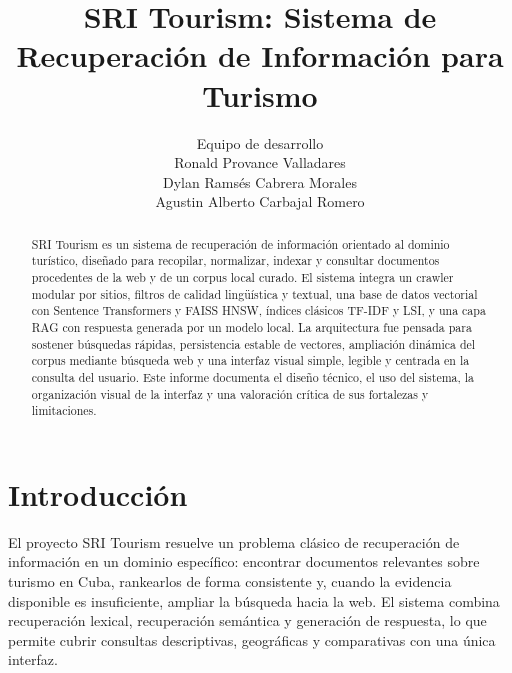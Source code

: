 \documentclass{llncs}
\begin{document}
\title{SRI Tourism: Sistema de Recuperación de Información para Turismo}


\author{
    Equipo de desarrollo\\
Ronald Provance Valladares\\
Dylan Ramsés Cabrera Morales\\ 
Agustin Alberto Carbajal Romero
}


\pagestyle{headings}
\maketitle

\begin{abstract}
SRI Tourism es un sistema de recuperación de información orientado al dominio turístico, diseñado para recopilar, normalizar, indexar y consultar documentos procedentes de la web y de un corpus local curado. El sistema integra un crawler modular por sitios, filtros de calidad lingüística y textual, una base de datos vectorial con Sentence Transformers y FAISS HNSW, índices clásicos TF-IDF y LSI, y una capa RAG con respuesta generada por un modelo local. La arquitectura fue pensada para sostener búsquedas rápidas, persistencia estable de vectores, ampliación dinámica del corpus mediante búsqueda web y una interfaz visual simple, legible y centrada en la consulta del usuario. Este informe documenta el diseño técnico, el uso del sistema, la organización visual de la interfaz y una valoración crítica de sus fortalezas y limitaciones.
\end{abstract}

\section{Introducción}

El proyecto SRI Tourism resuelve un problema clásico de recuperación de información en un dominio específico: encontrar documentos relevantes sobre turismo en Cuba, rankearlos de forma consistente y, cuando la evidencia disponible es insuficiente, ampliar la búsqueda hacia la web. El sistema combina recuperación lexical, recuperación semántica y generación de respuesta, lo que permite cubrir consultas descriptivas, geográficas y comparativas con una única interfaz.
\end{document}
